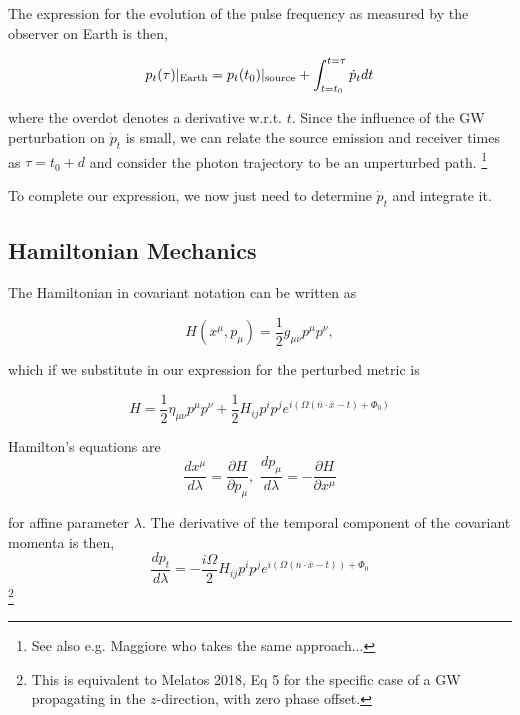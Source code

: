\documentclass{tufte-handout} %
\begin{document}
\noindent The expression for the evolution of the pulse frequency as measured by the observer on Earth is then,

\begin{equation}
	p_t(\tau)|_{\rm Earth} = p_t(t_0)|_{\rm source} + \int_{t = t_0}^{t=\tau} \dot{p}_t dt
	\end{equation}

\noindent where the overdot denotes a derivative w.r.t. $t$. Since the influence of the GW perturbation on $\dot{p}_t$ is small, we can relate the source emission and receiver times as $\tau = t_0 + d$ and consider the photon trajectory to be an unperturbed path. \footnote{See also e.g. Maggiore who takes the same approach...} \newline 


\noindent To complete our expression, we now just need to determine $\dot{p}_t$ and integrate it.


\subsection{Hamiltonian Mechanics}

The Hamiltonian in covariant notation can be written as 

\begin{equation}
H(x^{\mu}, p_{\mu}) = \frac{1}{2} g_{\mu \nu} p^{\mu} p^{\nu},
\end{equation}

\noindent which if we substitute in our expression for the perturbed metric is

\begin{equation}
H = \frac{1}{2} \eta_{\mu \nu} p^{\mu} p^{\nu} + \frac{1}{2} H_{ij}p^i p^j e^{i(\Omega(\bar{n} \cdot \bar{x} - t) + \Phi_0)	}
\end{equation}

\noindent Hamilton's equations are
\begin{equation}
\frac{dx^{\mu}}{d\lambda} = \frac{\partial H}{\partial p_{\mu}} , \, \, \frac{dp_{\mu}}{d \lambda} = -\frac{\partial H}{\partial x^{\mu}} 
\end{equation}

\noindent for affine parameter $\lambda$. The derivative of the temporal component of the covariant momenta is then,
\begin{equation}
\frac{d p_{t}}{d \lambda} = -\frac{i\Omega}{2} H_{ij}p^i p^j  e^{i(\Omega(\bar{n}\cdot \bar{x} - t))+\Phi_0}
\end{equation}
\footnote{This is equivalent to Melatos 2018, Eq 5 for the specific case of a GW propagating in the $z$-direction, with zero phase offset.}
\end{document}
